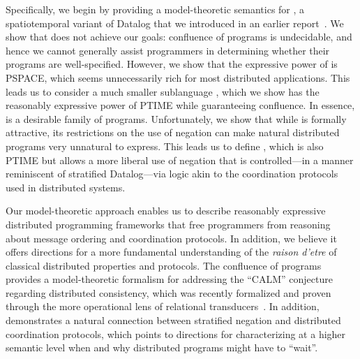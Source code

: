 Specifically, we begin by providing a model-theoretic semantics for \lang, a spatiotemporal variant of Datalog that we introduced in an earlier report~\cite{dedalus}.  We show that \lang does not achieve our goals: confluence of \lang programs is undecidable, and hence we cannot generally assist \lang programmers in determining whether their programs are well-specified.  However, we show that the expressive power of \lang is PSPACE, which seems unnecessarily rich for most distributed applications.  This leads us to consider a much smaller sublanguage \slang, which we show has the reasonably expressive power of PTIME while guaranteeing confluence. In essence, \slang is a desirable family of \lang programs.  Unfortunately, we show that while \slang is formally attractive, its restrictions on the use of negation can make natural distributed programs very unnatural to express.  This leads us to define \plang, which is also PTIME but allows a more liberal use of negation that is controlled---in a manner reminiscent of stratified Datalog---via logic akin to the coordination protocols used in distributed systems.  

Our model-theoretic approach enables us to describe reasonably expressive distributed programming frameworks that free programmers from reasoning about message ordering and coordination protocols.  In addition, we believe it offers directions for a more fundamental understanding of the {\em raison d'etre} of classical distributed properties and protocols.
The confluence of \slang programs provides a model-theoretic formalism for addressing the ``CALM'' conjecture~\cite{calm} regarding distributed consistency, which was recently formalized and proven through the more operational lens of relational transducers~\cite{ameloot11}.  In addition, \plang demonstrates a natural connection between stratified negation and distributed coordination protocols, which points to directions for characterizing at a higher semantic level when and why distributed programs might have to ``wait''.
